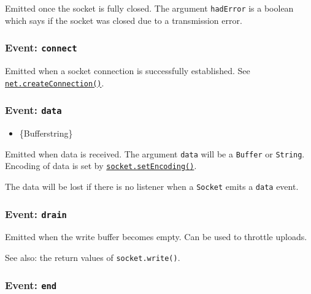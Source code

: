 Emitted once the socket is fully closed. The argument \texttt{hadError}
is a boolean which says if the socket was closed due to a transmission
error.

\subsubsection{\texorpdfstring{Event:
\texttt{\textquotesingle{}connect\textquotesingle{}}}{Event: \textquotesingle connect\textquotesingle{}}}\label{event-connect}

Emitted when a socket connection is successfully established. See
\hyperref[netcreateconnection]{\texttt{net.createConnection()}}.

\subsubsection{\texorpdfstring{Event:
\texttt{\textquotesingle{}data\textquotesingle{}}}{Event: \textquotesingle data\textquotesingle{}}}\label{event-data}

\begin{itemize}
\tightlist
\item
  \{Buffer\textbar string\}
\end{itemize}

Emitted when data is received. The argument \texttt{data} will be a
\texttt{Buffer} or \texttt{String}. Encoding of data is set by
\hyperref[socketsetencodingencoding]{\texttt{socket.setEncoding()}}.

The data will be lost if there is no listener when a \texttt{Socket}
emits a \texttt{\textquotesingle{}data\textquotesingle{}} event.

\subsubsection{\texorpdfstring{Event:
\texttt{\textquotesingle{}drain\textquotesingle{}}}{Event: \textquotesingle drain\textquotesingle{}}}\label{event-drain}

Emitted when the write buffer becomes empty. Can be used to throttle
uploads.

See also: the return values of \texttt{socket.write()}.

\subsubsection{\texorpdfstring{Event:
\texttt{\textquotesingle{}end\textquotesingle{}}}{Event: \textquotesingle end\textquotesingle{}}}\label{event-end}

